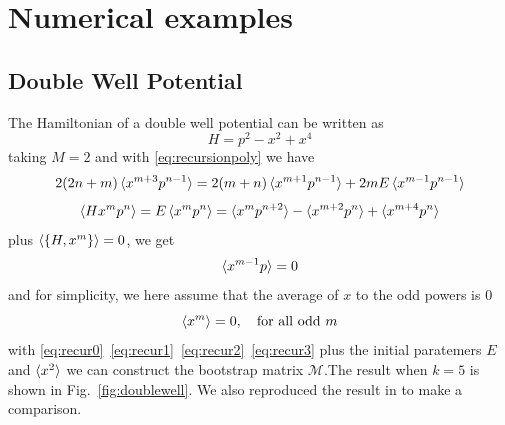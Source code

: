 \documentclass[aps, preprint,amsmath, amssymb]{revtex4-2}
\begin{document}
\section{Numerical examples}
\subsection {Double Well Potential}
The Hamiltonian of a double well potential can be written as
\begin{equation}
    H = p^2 - x^2 + x^4
\end{equation}
taking $M = 2$ and with \eqref{eq:recursionpoly} we have
\begin{equation}
    2(2n + m)\braket{x^{m + 3} p^{n - 1}} = 2(m + n)\braket{x^{m + 1} p^{n - 1}} + 2mE\braket{x^{m - 1} p^{n - 1}} \label{eq:recur0}
\end{equation}
\begin{equation}
    \braket{Hx^m p^n} = E\braket{x^m p^n} = \braket{x^m p^{n + 2}} - \braket{x^{m + 2} p^n} + \braket{x^{m + 4} p^n} \label{eq:recur1}
\end{equation}
plus $\braket{\{H, x^m\}} = 0$, we get
\begin{equation}
    \braket{x^{m - 1} p} = 0 \label{eq:recur2}
\end{equation}
and for simplicity, we here assume that the average of $x$ to the odd powers is $0$ 
\begin{equation}
    \braket{x^m} = 0,\ \ \ \text{for all odd}\ m \label{eq:recur3}
\end{equation}
with \eqref{eq:recur0}~\eqref{eq:recur1}~\eqref{eq:recur2}~\eqref{eq:recur3} plus the initial paratemers $E$ and $\braket{x^2}$ we can construct the bootstrap matrix $\bm{\mathcal{M}}$.The result when $k = 5$ is shown in Fig.~\ref{fig:doublewell}. We also reproduced the result in \cite{Nakayama_2022} to make a comparison.
\end{document}

